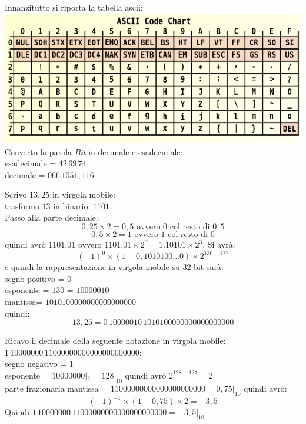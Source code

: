 \documentclass[a4paper,12pt, oneside]{book}
\begin{document}
\begin{esercizio}
  Innanzitutto si riporta la tabella ascii:\\
  \includegraphics[scale=0.5]{img/ascii.png}
  Converto la parola \textit{Bit} in decimale e esadecimale:\\
  esadecimale = $42\,69\,74$\\
  decimale = $ 066\,1051,116$
\end{esercizio}
\begin{esercizio}
  Scrivo $13,25$ in virgola mobile:\\
  trasformo $13$ in binario: $1101$.\\
  Passo alla parte decimale:\\
  $$0,25\times 2=0,5 \mbox{ ovvero } 0 \mbox{ col resto di } 0,5$$
  $$0,5\times 2=1 \mbox{ ovvero } 1 \mbox{ col resto di } 0$$
  quindi avrò $1101.01$ ovvero $1101.01\times 2^0=1.10101\times 2^3$. Si avrà:
  $$(-1)^0\times (1+0,1010100...0)\times 2^{130-127}$$
  e quindi la rappresentazione in virgola mobile su 32 bit  sarà:\\
  segno positivo = $0$\\
  esponente = $130$ = $10000010$\\
  mantissa= $1010100000000000000000$\\
  quindi:
  $$13,25=0\,10000010\,1010100000000000000000$$
\end{esercizio}
\begin{esercizio}
  Ricavo il decimale della seguente notazione in virgola mobile: $1\,10000000\,11000000000000000000000$:\\
  segno negativo = $1$\\
  esponente = $10000000|_2=128|_{10}$ quindi avrò $2^{128-127}=2$\\
  parte frazionaria mantissa = $11000000000000000000000=0,75|_{10}$
  quindi avrò:
  $$(-1)^{-1}\times (1+0,75)\times 2= -3,5$$
  Quindi $1\,10000000\,11000000000000000000000=-3,5|_{10}$
\end{esercizio}
\end{document}
